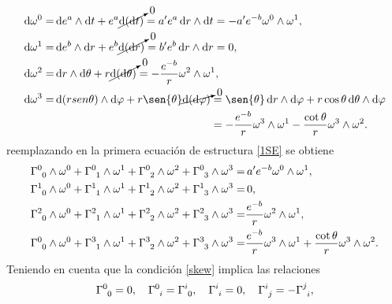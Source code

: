     \begin{align}
    \begin{split}
        \dd{\omega^0}=&\dd{e^a} \wedge \dd{t}+e^a\cancelto{0}{\dd{(\dd{t})}} = a^{\prime} e^a \dd{r}\wedge\dd{t} = -a^{\prime} e^{-b} \omega^0 \wedge \omega^1, \\
        \dd{\omega^1}=&\dd{e^b}\wedge\dd{r}+e^b\cancelto{0}{\dd{(\dd{r})}} = b^{\prime}e^b\dd{r}\wedge\dd{r}=0, \\
        \dd{\omega^2}=&\dd{r}\wedge\dd{\theta} + r\cancelto{0}{\dd{(\dd{\theta})}} = -\frac{e^{-b}}{r}\omega^2 \wedge\omega^1, \\
        \dd{\omega^3}=&\dd{(rsen\theta)}\wedge\dd{\varphi} + r\sen{\theta}\cancelto{0}{\dd{(\dd{\varphi})}} = \sen{\theta}\dd{r}\wedge\dd{\varphi} + r\cos{\theta}\dd{\theta}\wedge\dd{\varphi} \\
        & \phantom{{}\dd{(rsen\theta)}\wedge\dd{\varphi} + r\sen{\theta}\cancelto{0}{\dd{(\dd{\varphi})}}} = -\frac{e^{-b}}{r} \omega^3 \wedge \omega^1 - \frac{\cot{\theta}}{r} \omega^3 \wedge \omega^2.
    \end{split}
    \end{align}
reemplazando en la primera ecuación de estructura \eqref{1SE} se obtiene
    \begin{align}
    \begin{split}
        \tensor{\Gamma}{^0_0}\wedge\omega^0 + \tensor{\Gamma}{^0_1}\wedge\omega^1+\tensor{\Gamma}{^0_2}\wedge\omega^2+\tensor{\Gamma}{^0_3}\wedge\omega^3 =& \,a^{\prime} e^{-b} \omega^0 \wedge \omega^1,  \\
        \tensor{\Gamma}{^1_0}\wedge\omega^0 + \tensor{\Gamma}{^1_1}\wedge\omega^1+\tensor{\Gamma}{^1_2}\wedge\omega^2+\tensor{\Gamma}{^1_3}\wedge\omega^3 =&\, 0, \\
        \tensor{\Gamma}{^2_0}\wedge\omega^0 + \tensor{\Gamma}{^2_1}\wedge\omega^1+\tensor{\Gamma}{^2_2}\wedge\omega^2+\tensor{\Gamma}{^2_3}\wedge\omega^3 =& \frac{e^{-b}}{r}\omega^2 \wedge\omega^1, \\
        \tensor{\Gamma}{^0_0}\wedge\omega^0 + \tensor{\Gamma}{^3_1}\wedge\omega^1+\tensor{\Gamma}{^3_2}\wedge\omega^2+\tensor{\Gamma}{^3_3}\wedge\omega^3 =& \frac{e^{-b}}{r} \omega^3 \wedge \omega^1 + \frac{\cot{\theta}}{r} \omega^3 \wedge \omega^2.
        \end{split}\label{1ee}
    \end{align}    
Teniendo en cuenta que la condición \eqref{skew} implica las relaciones 
\begin{equation*}
    \tensor{\Gamma}{^0_0}=0,\quad \tensor{\Gamma}{^0_i} = \tensor{\Gamma}{^i_0}, \quad \tensor{\Gamma}{^i_i} = 0, \quad \tensor{\Gamma}{^i_j} = -\tensor{\Gamma}{^j_i},
\end{equation*}
